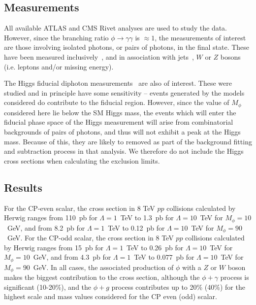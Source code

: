 \documentclass[11pt]{cernrep}
\begin{document}
\subsection{Measurements}

All available ATLAS and CMS Rivet analyses are used to study the data. However, since the branching ratio 
$\phi \rightarrow \gamma\gamma$ is $\approx 1$, the measurements of interest are those involving
isolated photons, or pairs of photons, in the final state. These have been measured 
inclusively~\cite{Aad:2012tba,Aad:2013zba,Aad:2016xcr}, and in 
association with jets~\cite{Chatrchyan:2013mwa,Aad:2013gaa,ATLAS:2012ar}, $W$ or $Z$ bosons\cite{Aad:2013izg,Aad:2016sau} (i.e. leptons and/or missing energy). 

The Higgs fiducial diphoton measurements~\cite{Aad:2014lwa} are also of interest. These were studied and in principle 
have some sensitivity -- events generated by the models considered do contribute to the fiducial region. However, since 
the value of $M_\phi$ considered here lie below the SM Higgs mass, the events which will enter the fiducial phase space
of the Higgs measurement will arise from combinatorial backgrounds of pairs of photons, and thus will not exhibit a 
peak at the Higgs mass. Because of this, they are likely to removed as part of the background fitting and subtraction 
process in that analysis. We therefore do not include the Higgs cross sections when calculating the exclusion limits.

\subsection{Results}

For the CP-even scalar, the cross section in 8 TeV $pp$ collisions calculated by Herwig ranges from 
110~pb for $\Lambda = 1$~TeV to 1.3~pb for $\Lambda = 10$~TeV for $M_\phi = 10$~GeV,
and from 
8.2~pb for $\Lambda = 1$~TeV to 0.12~pb for $\Lambda = 10$~TeV for $M_\phi = 90$~GeV.
For the CP-odd scalar, the cross section in 8 TeV $pp$ collisions calculated by Herwig ranges from 
15~pb for $\Lambda = 1$~TeV to 0.26~pb for $\Lambda = 10$~TeV for $M_\phi = 10$~GeV,
and from 
4.3~pb for $\Lambda = 1$~TeV to 0.077~pb for $\Lambda = 10$~TeV for $M_\phi = 90$~GeV. In all cases, the 
associated production of $\phi$ with a $Z$ or $W$ boson makes the biggest contribution to the cross section, 
although the $\phi + \gamma$ process is significant (10-20\%), and the $\phi + g$ process contributes up to
20\% (40\%) for the highest scale and mass values considered for the CP even (odd) scalar.
\end{document}
